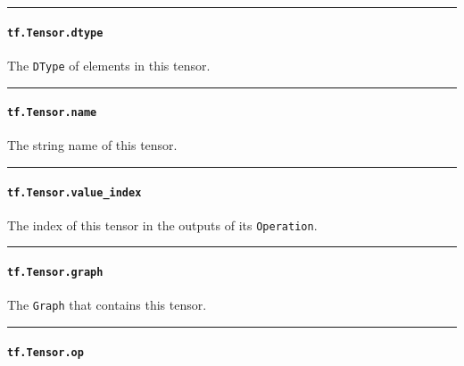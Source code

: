 \begin{center}\rule{0.5\linewidth}{\linethickness}\end{center}

\paragraph{\texorpdfstring{\lstinline{tf.Tensor.dtype}
}{tf.Tensor.dtype }}\label{tf.tensor.dtype}

The \lstinline{DType} of elements in this tensor.

\begin{center}\rule{0.5\linewidth}{\linethickness}\end{center}

\paragraph{\texorpdfstring{\lstinline{tf.Tensor.name}
}{tf.Tensor.name }}\label{tf.tensor.name}

The string name of this tensor.

\begin{center}\rule{0.5\linewidth}{\linethickness}\end{center}

\paragraph{\texorpdfstring{\lstinline{tf.Tensor.value_index}
}{tf.Tensor.value_index }}\label{tf.tensor.valueux5findex}

The index of this tensor in the outputs of its \lstinline{Operation}.

\begin{center}\rule{0.5\linewidth}{\linethickness}\end{center}

\paragraph{\texorpdfstring{\lstinline{tf.Tensor.graph}
}{tf.Tensor.graph }}\label{tf.tensor.graph}

The \lstinline{Graph} that contains this tensor.

\begin{center}\rule{0.5\linewidth}{\linethickness}\end{center}

\paragraph{\texorpdfstring{\lstinline{tf.Tensor.op}
}{tf.Tensor.op }}\label{tf.tensor.op}

